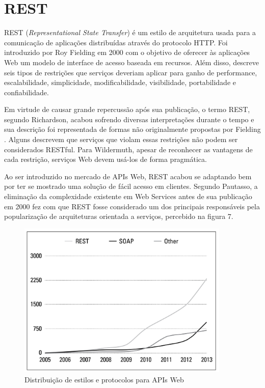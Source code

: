 \section{REST}

REST (\textit{Representational State Transfer}) é um estilo de arquitetura usada para a comunicação de aplicações distribuídas através do protocolo HTTP. Foi introduzido por Roy Fielding em 2000 com o objetivo de oferecer às aplicações Web um modelo de interface de acesso baseada em recursos. Além disso, descreve seis tipos de restrições que serviços deveriam aplicar para ganho de performance, escalabilidade, simplicidade, modificabilidade, visibilidade, portabilidade e confiabilidade.

Em virtude de causar grande repercussão após sua publicação, o termo REST, segundo Richardson, acabou sofrendo diversas interpretações durante o tempo e sua descrição foi representada de formas não originalmente propostas por Fielding \cite{RichardsonEtAl2013}. Alguns descrevem que serviços que violam essas restrições não podem ser considerados RESTful. Para Wildermuth, apesar de reconhecer as vantagens de cada restrição, serviços Web devem usá-los de forma pragmática. \cite{Wildermuth2015}

Ao ser introduzido no mercado de APIs Web, REST acabou se adaptando bem por ter se mostrado uma solução de fácil acesso em clientes. Segundo Pautasso, a eliminação da complexidade existente em Web Services antes de sua publicação em 2000 fez com que REST fosse considerado um dos principais responsáveis pela popularização de arquiteturas orientada a serviços, percebido na figura 7. \cite{PautassoEtAl2008}

\begin{figure}[H]
  \centering    \includegraphics[width=0.9\textwidth,height=\textheight,keepaspectratio]{figuras/api-styles.jpg}
  \caption{Distribuição de estilos e protocolos para APIs Web}
\end{figure}

